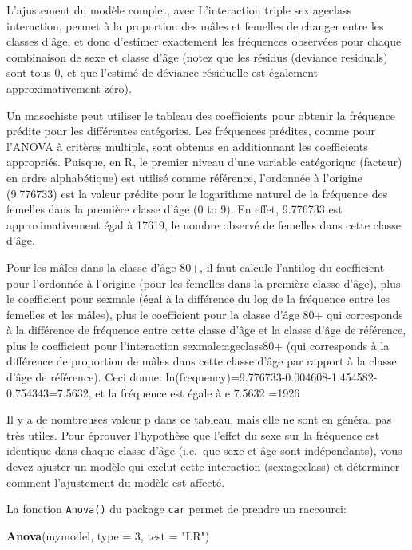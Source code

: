 \documentclass[
  12pt,
]{book}
\newenvironment{Shaded}{\begin{snugshade}}{\end{snugshade}}
\newcommand{\DataTypeTok}[1]{\textcolor[rgb]{0.13,0.29,0.53}{#1}}
\newcommand{\DecValTok}[1]{\textcolor[rgb]{0.00,0.00,0.81}{#1}}
\newcommand{\KeywordTok}[1]{\textcolor[rgb]{0.13,0.29,0.53}{\textbf{#1}}}
\newcommand{\NormalTok}[1]{#1}
\newcommand{\StringTok}[1]{\textcolor[rgb]{0.31,0.60,0.02}{#1}}
\begin{document}
L'ajustement du modèle complet, avec L'interaction triple sex:ageclass interaction, permet à la proportion des mâles et femelles de changer entre les classes d'âge, et donc d'estimer exactement les fréquences observées pour chaque combinaison de sexe et classe d'âge (notez que les résidus (deviance residuals) sont tous 0, et que l'estimé de déviance résiduelle est également approximativement zéro).

Un masochiste peut utiliser le tableau des coefficients pour obtenir la fréquence prédite pour les différentes catégories. Les fréquences prédites, comme pour l'ANOVA à critères multiple, sont obtenus en additionnant les coefficients appropriés. Puisque, en R, le premier niveau d'une variable catégorique (facteur) en ordre alphabétique) est utilisé comme référence, l'ordonnée à l'origine (9.776733) est la valeur prédite pour le logarithme naturel de la fréquence des femelles dans la première classe d'âge (0 to 9). En effet, 9.776733 est approximativement égal à 17619, le nombre observé de femelles dans cette classe d'âge.

Pour les mâles dans la classe d'âge 80+, il faut calcule l'antilog du coefficient pour l'ordonnée à l'origine (pour les femelles dans la première classe d'âge), plus le coefficient pour sexmale (égal à la différence du log de la fréquence entre les femelles et les mâles), plus le coefficient pour la classe d'âge 80+ qui corresponds à la différence de fréquence entre cette classe d'âge et la classe d'âge de référence, plus le coefficient pour l'interaction sexmale:ageclass80+ (qui corresponds à la différence de proportion de mâles dans cette classe d'âge par rapport à la classe d'âge de référence). Ceci donne: ln(frequency)=9.776733-0.004608-1.454582-0.754343=7.5632, et la fréquence est égale à e 7.5632 =1926

Il y a de nombreuses valeur p dans ce tableau, mais elle ne sont en général pas très utiles. Pour éprouver l'hypothèse que l'effet du sexe sur la fréquence est identique dans chaque classe d'âge (i.e.~que sexe et âge sont indépendants), vous devez ajuster un modèle qui exclut cette interaction (sex:ageclass) et déterminer comment l'ajustement du modèle est affecté.

La fonction \texttt{Anova()} du package \texttt{car} permet de prendre un raccourci:

\begin{Shaded}
\begin{Highlighting}[]
\KeywordTok{Anova}\NormalTok{(mymodel, }\DataTypeTok{type =} \DecValTok{3}\NormalTok{, }\DataTypeTok{test =} \StringTok{"LR"}\NormalTok{)}
\end{Highlighting}
\end{Shaded}
\end{document}
